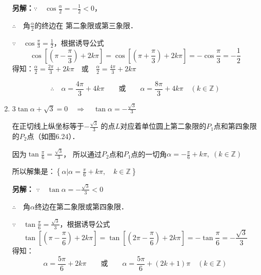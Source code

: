 \begin{solution}
\begin{enumerate}
\textbf{另解：}$\because\quad \cos\frac{\alpha}{2}=-\frac{1}{2}<0$，

$\therefore\quad $角$\frac{\alpha}{2}$的终边在
第二象限或第三象限．

$\because\quad \cos\frac{\pi}{3}=\frac{1}{2}$，根据诱导公式
\[\cos\left[\left(\pi-\frac{\pi}{3}\right)+2k\pi\right]=\cos\left[\left(\pi+\frac{\pi}{3}\right)+2k\pi\right]=-\cos\frac{\pi}{3}=-\frac{1}{2}\]
得知：$\frac{\alpha}{2}=\frac{2\pi}{3}+2k\pi\quad \text{或}\quad \frac{\alpha}{2}=\frac{4\pi}{3}+2k\pi$

\[\therefore\quad \alpha=\frac{4\pi}{3}+4k\pi\qquad \text{或}\qquad  \alpha =\frac{8\pi}{3}+4k\pi\quad  (k\in\mathbb{Z})\]

\item $3\tan\alpha+\sqrt{3}=0\quad \Rightarrow\quad \tan\alpha=-\frac{\sqrt{3}}{3}$

在正切线上纵坐标等于$-\frac{\sqrt{3}}{3}$
的点$L$对应着单位圆上第二象限的$P_1$点和第四象限的$P_2$点（如图6.24）．
\begin{figure}[htp]
    \centering
{}
    \caption{}
\end{figure}

因为$\tan\frac{\pi}{6}=\frac{\sqrt{3}}{3}$，
所以通过$P_2$点和$P_1$点的一切角$\alpha=-\frac{\pi}{6}+k\pi,\; (k\in\mathbb{Z})$

所以解集是：$\left\{\alpha\Big|\alpha=\frac{\pi}{6}+k\pi,\quad k\in\mathbb{Z}\right\}$

\textbf{另解：} $\because\quad \tan\alpha=-\frac{\sqrt{3}}{3}<0$

$\therefore\quad $角$\alpha$终边在第二象限或第四象限．

$\because\quad \tan\frac{\pi}{6}=\frac{\sqrt{3}}{3}$，根据诱导公式
\[\tan\left[\left(\pi-\frac{\pi}{6}\right)+2k\pi\right]=\tan\left[\left(2\pi-\frac{\pi}{6}\right)+2k\pi\right]=-\tan\frac{\pi}{6}=-\frac{\sqrt{3}}{3}\]
得知：
\[\alpha=\frac{5\pi}{6}+2k\pi\qquad \text{或}\qquad \alpha=\frac{5\pi}{6}+(2k+1)\pi\quad (k\in\mathbb{Z})\]
\end{enumerate}
\end{solution}


